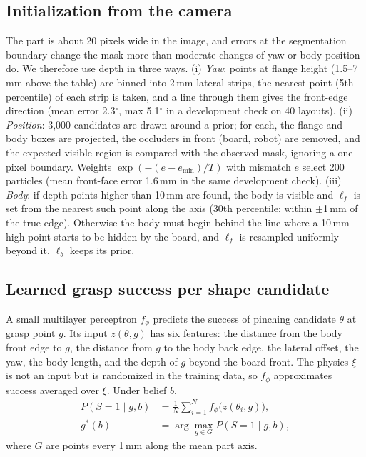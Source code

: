 \documentclass[conference]{IEEEtran}
\begin{document}
\subsection{Initialization from the camera}\label{sec:init}
The part is about 20 pixels wide in the image, and errors at the segmentation boundary change the mask more than moderate changes of yaw or body position do. We therefore use depth in three ways.
(i) \emph{Yaw}: points at flange height (1.5--7\,mm above the table) are binned into 2\,mm lateral strips, the nearest point (5th percentile) of each strip is taken, and a line through them gives the front-edge direction (mean error 2.3$^\circ$, max 5.1$^\circ$ in a development check on 40 layouts).
(ii) \emph{Position}: 3,000 candidates are drawn around a prior; for each, the flange and body boxes are projected, the occluders in front (board, robot) are removed, and the expected visible region is compared with the observed mask, ignoring a one-pixel boundary. Weights $\exp(-(e-e_{\min})/T)$ with mismatch $e$ select 200 particles (mean front-face error 1.6\,mm in the same development check).
(iii) \emph{Body}: if depth points higher than 10\,mm are found, the body is visible and $\ell_f$ is set from the nearest such point along the axis (30th percentile; within $\pm$1\,mm of the true edge). Otherwise the body must begin behind the line where a 10\,mm-high point starts to be hidden by the board, and $\ell_f$ is resampled uniformly beyond it. $\ell_b$ keeps its prior.

\subsection{Learned grasp success per shape candidate}\label{sec:pred}
A small multilayer perceptron $f_\phi$ predicts the success of pinching candidate $\theta$ at grasp point $g$. Its input $z(\theta,g)$ has six features: the distance from the body front edge to $g$, the distance from $g$ to the body back edge, the lateral offset, the yaw, the body length, and the depth of $g$ beyond the board front. The physics $\xi$ is not an input but is randomized in the training data, so $f_\phi$ approximates success averaged over $\xi$. Under belief $b$,
\begin{align}
P(S{=}1\mid g,b)&=\frac{1}{N}\sum_{i=1}^{N} f_\phi\bigl(z(\theta_i,g)\bigr),\\
g^*(b)&=\arg\max_{g\in G} P(S{=}1\mid g,b),
\end{align}
where $G$ are points every 1\,mm along the mean part axis.
\end{document}
